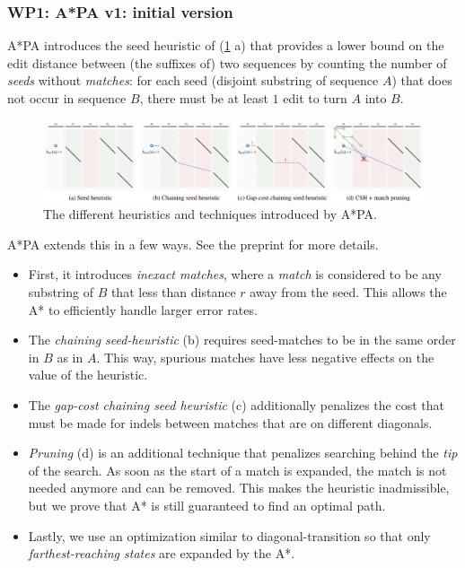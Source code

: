 \documentclass[11pt,english,a4paper]{article}
\begin{document}
\subsubsection{WP1: A*PA v1: initial version}
\label{sec:org7faa189}
A*PA \autocite{astarpa} introduces the seed heuristic of \textcite{astarix-2}
(\ref{astarpa} a) that provides a lower bound on the edit distance between (the
suffixes of) two sequences by counting the number of \emph{seeds} without \emph{matches}:
for each seed (disjoint substring of sequence \(A\)) that does not occur in
sequence \(B\), there must be at least \(1\) edit to turn \(A\) into \(B\).

\begin{figure}[h]
\centering
\includegraphics[width=.9\linewidth]{astarpa.png}
\caption{\label{astarpa}The different heuristics and techniques introduced by A*PA.}
\end{figure}

A*PA extends this in a few ways. See the preprint for more details.
\begin{itemize}
\item First, it introduces \emph{inexact matches}, where a \emph{match} is considered to be
any substring of \(B\) that less than distance \(r\) away from the seed. This
allows the A* to efficiently handle larger error rates.
\item The \emph{chaining seed-heuristic} (b) requires seed-matches to be in the same
order in \(B\) as in \(A\). This way, spurious matches have less negative effects
on the value of the heuristic.
\item The \emph{gap-cost chaining seed heuristic} (c) additionally penalizes the
cost that must be made for indels between matches that are on different diagonals.
\item \emph{Pruning} (d) is an additional technique that penalizes searching behind the \emph{tip}
of the search. As soon as the start of a match is expanded, the match is not
needed anymore and can be removed. This makes the heuristic inadmissible, but
we prove that A* is still guaranteed to find an optimal path.
\item Lastly, we use an optimization similar to diagonal-transition so that only
\emph{farthest-reaching states} are expanded by the A*.
\end{itemize}
\end{document}
